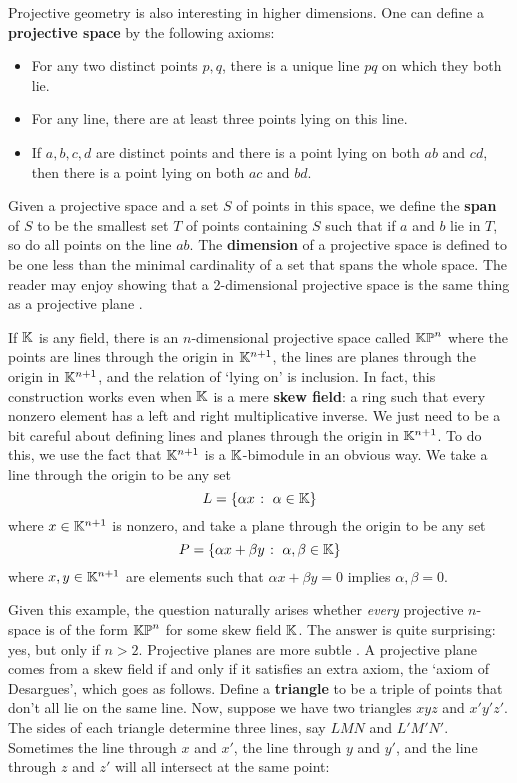 Projective geometry is also interesting in higher dimensions. 
One can define a {\bf projective space} by the following axioms: 
\begin{itemize} 
\item For any two distinct points $p,q$, there is a unique line 
$pq$ on which they both lie. 
\item For any line, there are at least three points lying on this line. 
\item If $a,b,c,d$ are distinct points and there is a point lying 
on both $ab$ and $cd$, then there is a point lying on both $ac$ and $bd$. 
\end{itemize} 
Given a projective space and a set $S$ of points in this space, we 
define the {\bf span} of $S$ to be the smallest set $T$ of points
containing $S$ such that if $a$ and $b$ lie in $T$, so do all points
on the line $ab$.  The {\bf dimension}  
of a projective space is defined to be one less than the minimal 
cardinality of a set that spans the whole space.  The reader may enjoy 
showing that a 2-dimensional projective space is the same thing as a 
projective plane \cite{Garner}. 
 
If ${\mathbb K}$ is any field, there is an $n$-dimensional projective space  
called ${\mathbb {KP}}^n$ where the points are lines through the origin in 
${\mathbb K}^{n+1}$, the lines are planes through the origin in ${\mathbb K}^{n+1}$, and 
the relation of `lying on' is inclusion.  In fact, this construction 
works even when ${\mathbb K}$ is a mere {\bf skew field}: a ring such that every 
nonzero element has a left and right multiplicative inverse.   We just 
need to be a bit careful about defining lines and planes through the 
origin in ${\mathbb K}^{n+1}$.  To do this, we use the fact that ${\mathbb K}^{n+1}$ is a 
${\mathbb K}$-bimodule in an obvious way.  We take a line through the origin to 
be any set  
\[   L = \{ \alpha x \; \colon\; \alpha \in {\mathbb K} \}  \] 
where $x \in {\mathbb K}^{n+1}$ is nonzero, and take a plane through the 
origin to be any set 
\[   P = \{ \alpha x + \beta y \; \colon \; \alpha,\beta \in {\mathbb K} \} \] 
where $x,y \in {\mathbb K}^{n+1}$ are elements such that  
$\alpha x + \beta y = 0$ implies $\alpha,\beta = 0$.  
 
Given this example, the question naturally arises whether {\it every} 
projective $n$-space is of the form ${\mathbb {KP}}^n$ for some skew field ${\mathbb K}$. 
The answer is quite surprising: yes, but only if $n > 2$.  Projective 
planes are more subtle \cite{Stevenson}.  A projective plane comes 
from a skew field if and only if it satisfies an extra axiom, the 
`axiom of Desargues', which goes as follows.  Define a {\bf triangle}  
to be a triple of points that don't all lie on the same line.  Now,  
suppose we have two triangles $xyz$ and $x'y'z'$.  The sides of each  
triangle determine three lines, say $LMN$ and $L'M'N'$.  Sometimes  
the line through $x$ and $x'$, the line through $y$ and $y'$, and  
the line through $z$ and $z'$ will all intersect at the same point: 

